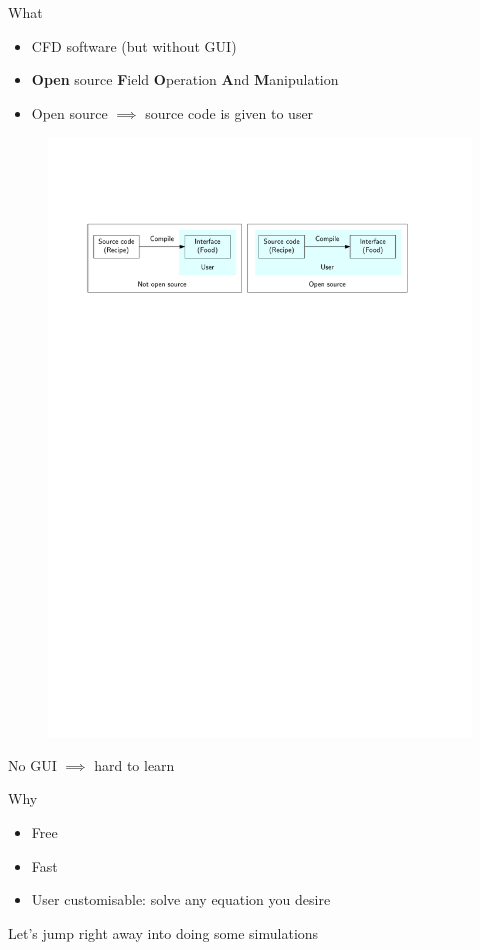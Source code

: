 \begin{frame}
    \begin{block}{What}
        \begin{itemize}
            \item CFD software (but without GUI)
            \item \textbf{Open} source \textbf{F}ield \textbf{O}peration \textbf{A}nd \textbf{M}anipulation
            \item Open source $\implies$ source code is given to user
        \end{itemize}
    \end{block}
    \begin{figure}
        \includegraphics[width=\linewidth]{opensource_illustration}
    \end{figure}
    No GUI $\implies$ hard to learn
    \begin{block}{Why}
        \begin{itemize}
            \item Free
            \item Fast
            \item User customisable: solve any equation you desire
        \end{itemize}
    \end{block}
    Let's jump right away into doing some simulations
\end{frame}

